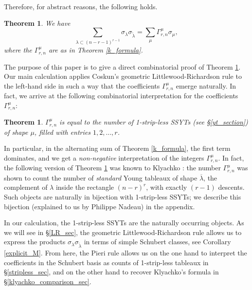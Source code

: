 \documentclass[11pt]{article}
\newtheorem{thm}[theo]{Theorem}
\theoremstyle{definition}
\numberwithin{equation}{section}
\begin{document}
Therefore, for abstract reasons, the following holds.

\begin{thm}\label{main_formula}
We have
\begin{equation*}
\sum_{\lambda\subset(n-r-1)^{r-1}}\sigma_{\lambda}\sigma_{\widetilde{\lambda}}=\sum_{\mu} \Gamma^\mu_{r,n}\sigma_{\mu},
\end{equation*}
where the $\Gamma^\mu_{r,n}$ are as in Theorem \ref{k_formula}.
\end{thm}

The purpose of this paper is to give a direct combinatorial proof of Theorem \ref{main_formula}. Our main calculation applies Coskun's geometric Littlewood-Richardson rule \cite{Cos09} to the left-hand side in such a way that the coefficients $\Gamma^\mu_{r,n}$ emerge naturally. In fact, we arrive at the following combinatorial interpretation for the coefficients $\Gamma^\mu_{r,n}$:

\begin{thm}\label{stripless_interpretation}
$\Gamma^\mu_{r,n}$ is equal to the number of \textit{1-strip-less} SSYTs (see \S\ref{yt_section}) of shape $\mu$, filled with entries $1,2,\ldots,r$. 
\end{thm}

In particular, in the alternating sum of Theorem \ref{k_formula}, the first term dominates, and we get a \emph{non-negative} interpretation of the integers $\Gamma^\mu_{r,n}$. In fact, the following version of Theorem \ref{stripless_interpretation} was known to Klyachko \cite[Theorem 3.3]{K95}: the number $\Gamma^\mu_{r,n}$ was shown to count the number of \emph{standard} Young tableaux of shape $\overline{\lambda}$, the complement of $\lambda$ inside the rectangle $(n-r)^r$, with exactly $(r-1)$ descents. Such objects are naturally in bijection with 1-strip-less SSYTs; we describe this bijection (explained to us by Philippe Nadeau) in the appendix.

In our calculation, the 1-strip-less SSYTs are the naturally occurring objects. As we will see in \S\ref{LR_sec}, the geometric Littlewood-Richardson rule allows us to express the products $\sigma_{\lambda}\sigma_{\widetilde{\lambda}}$ in terms of simple Schubert classes, see Corollary \ref{explicit_M}. From here, the Pieri rule allows us on the one hand to interpret the coefficients in the Schubert basis as counts of 1-strip-less tableaux in \S\ref{stripless_sec}, and on the other hand to recover Klyachko's formula in \S\ref{klyachko_comparison_sec}.
\end{document}
